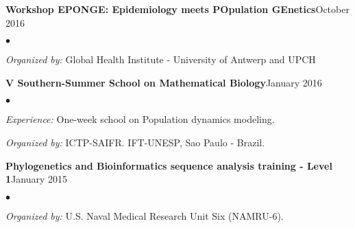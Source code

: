 \documentclass[margin,line]{res}
\newenvironment{list2}{
  \begin{list}{$\bullet$}{%
      \setlength{\itemsep}{0in}
      \setlength{\parsep}{0in} \setlength{\parskip}{0in}
      \setlength{\topsep}{0in} \setlength{\partopsep}{0in}
      \setlength{\leftmargin}{0.2in}}}{\end{list}}
\begin{document}
\begin{resume}
{\bf Workshop EPONGE: Epidemiology meets POpulation GEnetics}\hfill {October 2016}\\
	\vspace*{-.1in}
\begin{list2} %
	\item \textit{Organized by:} Global Health Institute - University of Antwerp and UPCH %
\end{list2}

{\bf V Southern-Summer School on Mathematical Biology}\hfill {January 2016}\\
	\vspace*{-.1in}%
\begin{list2} %
	\item \textit{Experience:} One-week school on Population dynamics modeling.
	\item \textit{Organized by:} ICTP-SAIFR. IFT-UNESP, Sao Paulo - Brazil.
\end{list2}

{\bf Phylogenetics and Bioinformatics sequence analysis training - Level 1}\hfill {January 2015}\\
	\vspace*{-.1in}
\begin{list2} %
	\item \textit{Organized by:} U.S. Naval Medical Research Unit Six (NAMRU-6).%
\end{list2}






\end{resume}
\end{document}
